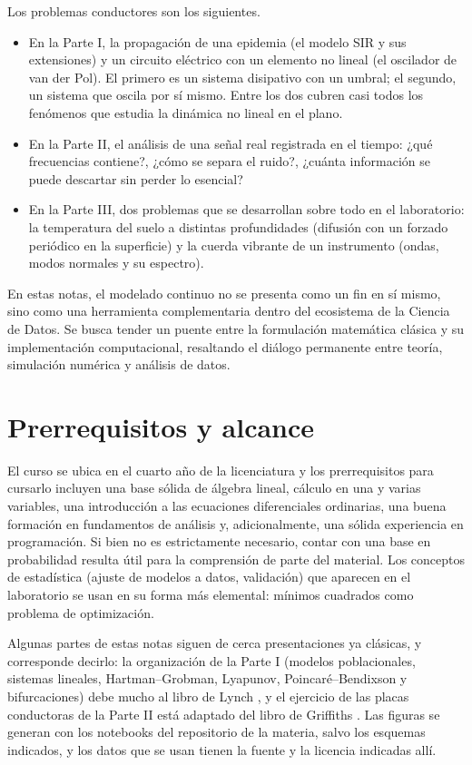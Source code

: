 \documentclass[12pt, a4paper]{amsbook}
\theoremstyle{remark}
\theoremstyle{definition}
\numberwithin{section}{chapter}
\numberwithin{subsection}{section}
\numberwithin{equation}{section}
\numberwithin{figure}{chapter}
\begin{document}
Los problemas conductores son los siguientes.
\begin{itemize}
\item En la Parte I, la propagación de una epidemia (el modelo SIR y sus extensiones) y un circuito eléctrico con un elemento no lineal (el oscilador de van der Pol). El primero es un sistema disipativo con un umbral; el segundo, un sistema que oscila por sí mismo. Entre los dos cubren casi todos los fenómenos que estudia la dinámica no lineal en el plano.

\item En la Parte II, el análisis de una señal real registrada en el tiempo: ¿qué frecuencias contiene?, ¿cómo se separa el ruido?, ¿cuánta información se puede descartar sin perder lo esencial?

\item En la Parte III, dos problemas que se desarrollan sobre todo en el laboratorio: la temperatura del suelo a distintas profundidades (difusión con un forzado periódico en la superficie) y la cuerda vibrante de un instrumento (ondas, modos normales y su espectro).
\end{itemize}

En estas notas, el modelado continuo no se presenta como un fin en sí mismo, sino como una herramienta complementaria dentro del ecosistema de la Ciencia de Datos. Se busca tender un puente entre la formulación matemática clásica y su implementación computacional, resaltando el diálogo permanente entre teoría, simulación numérica y análisis de datos.

\section*{Prerrequisitos y alcance}

El curso se ubica en el cuarto año de la licenciatura y los prerrequisitos para cursarlo incluyen una base sólida de álgebra lineal, cálculo en una y varias variables, una introducción a las ecuaciones diferenciales ordinarias, una buena formación en fundamentos de análisis y, adicionalmente, una sólida experiencia en programación. Si bien no es estrictamente necesario, contar con una base en probabilidad resulta útil para la comprensión de parte del material. Los conceptos de estadística (ajuste de modelos a datos, validación) que aparecen en el laboratorio se usan en su forma más elemental: mínimos cuadrados como problema de optimización.

Algunas partes de estas notas siguen de cerca presentaciones ya clásicas, y corresponde decirlo: la organización de la Parte I (modelos poblacionales, sistemas lineales, Hartman--Grobman, Lyapunov, Poincaré--Bendixson y bifurcaciones) debe mucho al libro de Lynch \cite{Lynch}, y el ejercicio de las placas conductoras de la Parte II está adaptado del libro de Griffiths \cite{Griffiths}. Las figuras se generan con los notebooks del repositorio de la materia, salvo los esquemas indicados, y los datos que se usan tienen la fuente y la licencia indicadas allí.
\end{document}
